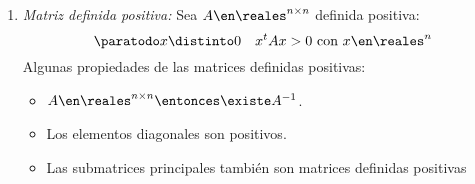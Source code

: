 \begin{enumerate}[label=\tiny\purple{\faIcon{snowman}}]
  \item \textit{Matriz definida positiva:}
        Sea  $A \en \reales^{n \times n}$ definida positiva:
        $$
          \paratodo x \distinto 0 \quad x^t A x > 0 \text{ con } x \en \reales^n
        $$
        Algunas propiedades de las matrices definidas positivas:
        \begin{itemize}
                \item  $A\en \reales^{n \times n} \entonces \existe A^{-1}$. 
                \item  Los elementos diagonales son positivos.
                \item  Las submatrices principales también son matrices definidas positivas
        \end{itemize}
\end{enumerate}
